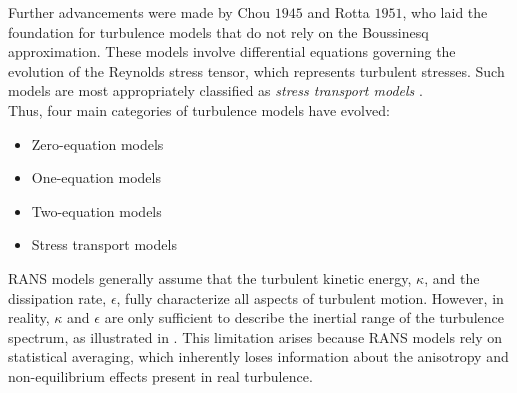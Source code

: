 Further advancements were made by Chou $1945$ and Rotta $1951$, who laid the
foundation for turbulence models that do not rely on the Boussinesq
approximation. These models involve differential equations governing the
evolution of the Reynolds stress tensor, which represents turbulent stresses.
Such models are most appropriately classified as \textit{stress transport
models} \cite{Wilcox1998}.\\

Thus, four main categories of turbulence models have evolved:
\begin{itemize}
    \item Zero-equation models  
    \item One-equation models  
    \item Two-equation models  
    \item Stress transport models  
\end{itemize}

\gls{RANS} models generally assume that the turbulent kinetic energy, $\kappa$,
and the dissipation rate, $\epsilon$, fully characterize all aspects of
turbulent motion. However, in reality, $\kappa$ and $\epsilon$ are only
sufficient to describe the inertial range of the turbulence spectrum, as
illustrated in  \cite{DahmNotes}. This limitation
arises because \gls{RANS} models rely on statistical averaging, which
inherently loses information about the anisotropy and non-equilibrium effects
present in real turbulence.
